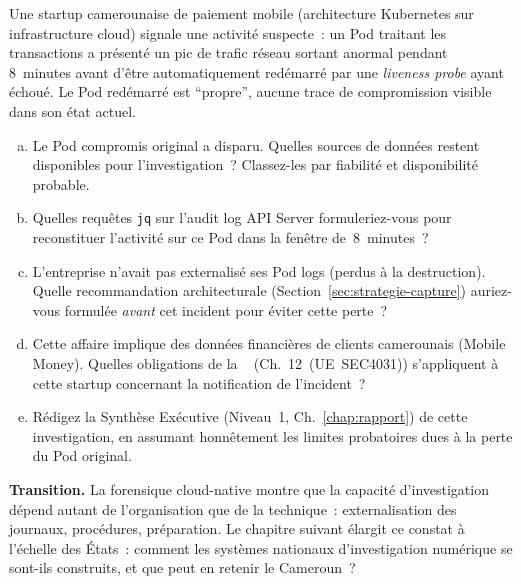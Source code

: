 \begin{boxexo}[title={\ding{45}\quad Exercice~24.3. Incident Kubernetes complet \niveauexpert}]
Une startup camerounaise de paiement mobile (architecture
Kubernetes sur infrastructure cloud) signale une activité suspecte~:
un Pod traitant les transactions a présenté un pic de trafic réseau
sortant anormal pendant 8~minutes avant d'être automatiquement
redémarré par une \textit{liveness probe} ayant échoué. Le Pod
redémarré est ``propre'', aucune trace de compromission visible
dans son état actuel.
\begin{enumerate}[(a)]
    \item Le Pod compromis original a disparu. Quelles sources
          de données restent disponibles pour l'investigation~?
          Classez-les par fiabilité et disponibilité probable.
    \item Quelles requêtes \texttt{jq} sur l'audit log API Server
          formuleriez-vous pour reconstituer l'activité sur ce
          Pod dans la fenêtre de~8~minutes~?
    \item L'entreprise n'avait pas externalisé ses Pod logs
          (perdus à la destruction). Quelle recommandation
          architecturale (Section~\ref{sec:strategie-capture})
          auriez-vous formulée \emph{avant} cet incident pour
          éviter cette perte~?
    \item Cette affaire implique des données financières de
          clients camerounais (Mobile Money). Quelles obligations
          de la ~\cite{cameroun2024donnees} (Ch.~12~(UE~SEC4031))
          s'appliquent à cette startup concernant la notification
          de l'incident~?
    \item Rédigez la Synthèse Exécutive (Niveau~1, Ch.~\ref{chap:rapport})
          de cette investigation, en assumant honnêtement les
          limites probatoires dues à la perte du Pod original.
\end{enumerate}
\end{boxexo}

\bigskip

\begin{boxinfo}
\textbf{Transition.} La forensique cloud-native montre que la
capacité d'investigation dépend autant de l'organisation que de
la technique~: externalisation des journaux, procédures, préparation.
Le chapitre suivant élargit ce constat à l'échelle des États~: comment
les systèmes nationaux d'investigation numérique se sont-ils construits,
et que peut en retenir le Cameroun~?
\end{boxinfo}